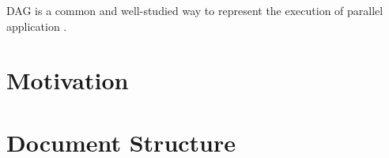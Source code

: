 DAG is a common and well-studied way to represent the execution of
parallel application \cite{zheng20131673,
  Blumofe:1996:ADD:237502.237574}.


\section{Motivation}

\section{Document Structure}











